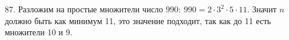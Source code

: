 87. Разложим на простые множители число $990:\ 990=2\cdot3^2\cdot5\cdot11.$ Значит $n$ должно быть как минимум 11, это значение подходит, так как до 11 есть множители 10 и 9.\\
